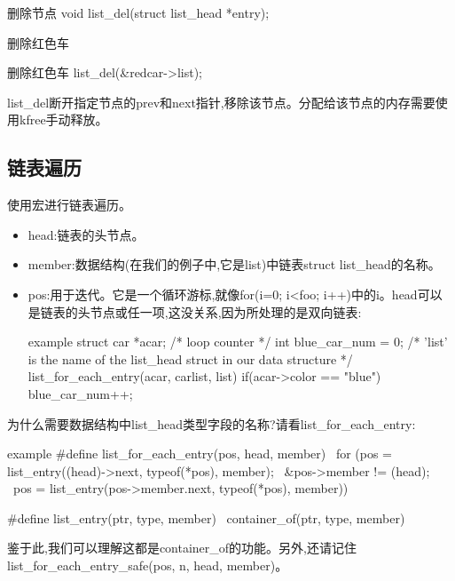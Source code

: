 \documentclass[lang=cn,newtx,10pt,scheme=chinese]{elegantbook}
\begin{document}
\begin{mycode}{删除节点}
void list_del(struct list_head *entry);
\end{mycode}

删除红色车

\begin{mycode}{删除红色车}
list_del(&redcar->list);
\end{mycode}

\begin{marker}
list\_del断开指定节点的prev和next指针,移除该节点。分配给该节点的内存需要使用kfree手动释放。
\end{marker}

\subsection{链表遍历}

使用宏进行链表遍历。

\begin{itemize}
\item head:链表的头节点。
\item member:数据结构(在我们的例子中,它是list)中链表struct list\_head的名称。
\item pos:用于迭代。它是一个循环游标,就像for(i=0; i<foo; i++)中的i。head可以是链表的头节点或任一项,这没关系,因为所处理的是双向链表:
\begin{mycode}{example}
struct car *acar; /* loop counter */
int blue_car_num = 0;
/* 'list' is the name of the list_head struct in our data structure */
list_for_each_entry(acar, carlist, list) {
    if(acar->color == "blue")
        blue_car_num++;
}
\end{mycode}
\end{itemize}

为什么需要数据结构中list\_head类型字段的名称?请看list\_for\_each\_entry:

\begin{mycode}{example}
#define list_for_each_entry(pos, head, member)                  \
for (pos = list_entry((head)->next, typeof(*pos), member);      \
    &pos->member != (head);                                     \
    pos = list_entry(pos->member.next, typeof(*pos), member))

#define list_entry(ptr, type, member)                           \
    container_of(ptr, type, member)
\end{mycode}

鉴于此,我们可以理解这都是container\_of的功能。另外,还请记住list\_for\_each\_entry\_safe(pos, n, head, member)。
\end{document}
